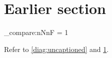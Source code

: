 \documentclass{article}
\begin{document}
\section{Earlier section}\label{sec:earlier}
\ExplSyntaxOn
\int_compare:nNnF {\value{figure}} = {1}
  {\PackageError{diagram-label}{Uncaptioned float was not numbered}{}}
\ExplSyntaxOff
Refer to \ref{diag:uncaptioned} and \ref{sec:earlier}.
\end{document}
